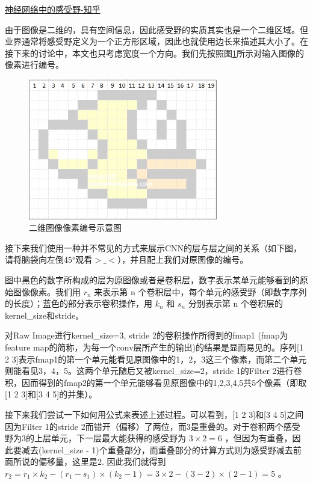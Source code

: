 \href{https://zhuanlan.zhihu.com/p/28492837}{神经网络中的感受野-知乎}

由于图像是二维的，具有空间信息，因此感受野的实质其实也是一个二维区域。但业界通常将感受野定义为一个正方形区域，因此也就使用边长来描述其大小了。在接下来的讨论中，本文也只考虑宽度一个方向。我们先按照图\ref{PerceptionField0}所示对输入图像的像素进行编号。

\begin{figure}[!hbtp]
\centering
\includegraphics[width=0.75\textwidth]{DLTips/PerceptionField0.jpg}
\caption{二维图像像素编号示意图}
\label{PerceptionField0}
\end{figure}

接下来我们使用一种并不常见的方式来展示CNN的层与层之间的关系（如下图，请将脑袋向左倒45°观看$>\_<$），并且配上我们对原图像的编号。

图中黑色的数字所构成的层为原图像或者是卷积层，数字表示某单元能够看到的原始图像像素。我们用 $r_n$ 来表示第 n 个卷积层中，每个单元的感受野（即数字序列的长度）；蓝色的部分表示卷积操作，用 $k_n$ 和 $s_n$ 分别表示第 n 个卷积层的kernel\_size和stride。

对Raw Image进行kernel\_size=3, stride 2的卷积操作所得到的fmap1 (fmap为feature map的简称，为每一个conv层所产生的输出)的结果是显而易见的。序列[1 2 3]表示fmap1的第一个单元能看见原图像中的1，2，3这三个像素，而第二个单元则能看见3，4，5。这两个单元随后又被kernel\_size=2，stride 1的Filter 2进行卷积，因而得到的fmap2的第一个单元能够看见原图像中的1,2,3,4,5共5个像素（即取[1 2 3]和[3 4 5]的并集）。

接下来我们尝试一下如何用公式来表述上述过程。可以看到，[1 2 3]和[3 4 5]之间因为Filter 1的stride 2而错开（偏移）了两位，而3是重叠的。对于卷积两个感受野为3的上层单元，下一层最大能获得的感受野为 $3\times2=6$ ，但因为有重叠，因此要减去(kernel\_size - 1)个重叠部分，而重叠部分的计算方式则为感受野减去前面所说的偏移量，这里是2. 因此我们就得到 $r_2=r_1\times k_2-(r_1-s_1)\times(k_2-1)=3\times2-(3-2)\times(2-1)=5$ 。

